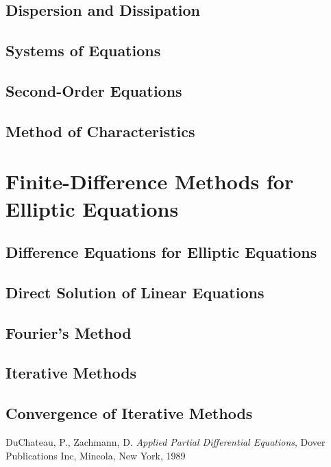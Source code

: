 \documentclass{amsbook}%
\theoremstyle{plain}
\numberwithin{equation}{section}
\begin{document}
	\section{Dispersion and Dissipation}
	
	\section{Systems of Equations}
	
	\section{Second-Order Equations}
	
	\section{Method of Characteristics}
		
\chapter{Finite-Difference Methods for Elliptic Equations}

	\section{Difference Equations for Elliptic Equations}
	
	\section{Direct Solution of Linear Equations}
	
	\section{Fourier's Method}
	
	\section{Iterative Methods}
	
	\section{Convergence of Iterative Methods}
			

\backmatter

\begin{thebibliography}{9}
DuChateau, P., Zachmann, D. \textit{Applied Partial Differential Equations}, Dover Publications Inc,
Mineola, New York, 1989

\end{thebibliography}
\end{document}
